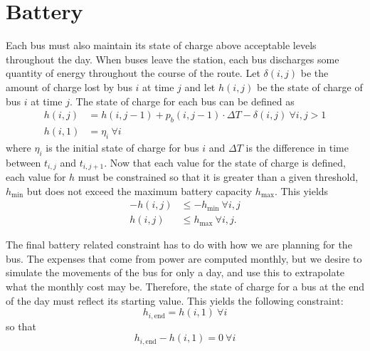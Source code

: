 \section{Battery}
\par Each bus must also maintain its state of charge above acceptable levels throughout the day.  When buses leave the station, each bus discharges some quantity of energy throughout the course of the route. Let $\delta(i,j)$ be the amount of charge lost by bus $i$ at time $j$ and let $h(i,j)$ be the state of charge of bus $i$ at time $j$. The state of charge for each bus can be defined as
\begin{equation}\begin{aligned}
	h(i,j) &= h(i,j-1) + p_b(i,j - 1)\cdot \Delta T - \delta(i,j) \ \forall i,j>1 \\
	h(i,1) &= \eta_i \ \forall i
\end{aligned}\end{equation}
where $\eta_i$ is the initial state of charge for bus $i$ and $\Delta T$ is the difference in time between $t_{i,j}$ and $t_{i,j+1}$.
Now that each value for the state of charge is defined, each value for $h$ must be constrained so that it is greater than a given threshold, $h_{\text{min}}$ but does not exceed the maximum battery capacity $h_{\text{max}}$. This yields
\begin{equation} \begin{aligned}
	-h(i,j) &\le -h_{\text{min}}\ \forall i,j \\
	h(i,j) &\le h_{\text{max}} \ \forall i,j. 
\end{aligned}\end{equation}
\par The final battery related constraint has to do with how we are planning for the bus.  The expenses that come from power are computed monthly, but we desire to simulate the movements of the bus for only a day, and use this to extrapolate what the monthly cost may be.  Therefore, the state of charge for a bus at the end of the day must reflect its starting value.  This yields the following constraint:
\begin{equation*}
	h_{i,\text{end}} = h(i,1) \ \forall i
\end{equation*}
so that
\begin{equation}
	h_{i,\text{end}} - h(i,1)  = 0 \ \forall i
\end{equation}

